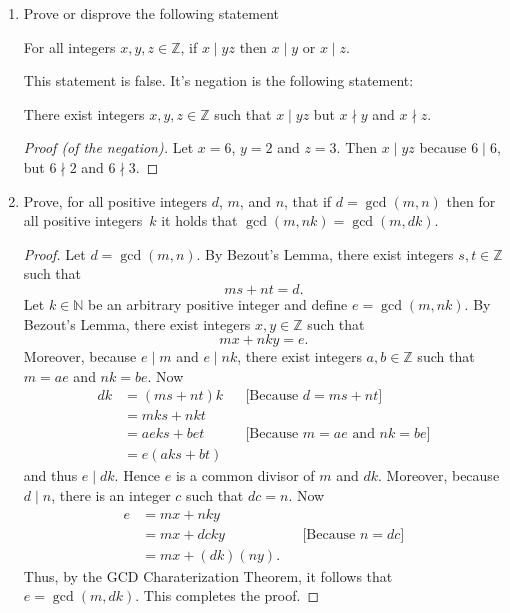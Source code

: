 \documentclass[11pt]{article}
\def\naturals{\mathbb{N}}
\def\integers{\mathbb{Z}}
\begin{document}
\begin{enumerate}
\begin{Solution}
\end{Solution}


\item Prove or disprove the following statement
\begin{center}
 For all integers $x,y,z\in\integers$, if $x\mid yz$ then $x\mid y $ or $x\mid z$. 
\end{center}

\begin{Solution}
 This statement is false. It's negation is the following statement:
 \begin{center}
  There exist integers $x,y,z\in\integers$ such that $x\mid yz$ but $x\nmid y$ and $x\nmid z$.
 \end{center}
\begin{proof}[Proof (of the negation)]
 Let $x=6$, $y=2$ and $z=3$. Then $x\mid yz$ because $6\mid 6$, but $6\nmid 2$ and $6\nmid 3$.
\end{proof}

\end{Solution}



\item Prove, for all positive integers $d$, $m$, and $n$, that if $d=\gcd(m,n)$ then for all positive integers~$k$ it holds that $\gcd(m,nk)=\gcd(m,dk)$.

\begin{Solution}
 \begin{proof}
Let $d=\gcd(m,n)$. By Bezout's Lemma, there exist integers $s,t\in\integers$ such that 
\[
 ms+nt = d.
\]
Let $k\in\naturals$ be an arbitrary positive integer and define $e=\gcd(m,nk)$. By Bezout's Lemma, there exist integers $x,y\in\integers$ such that 
\[
 mx + nky = e.
\]
Moreover, because $e\mid m$ and $e\mid nk$, there exist integers $a,b\in\integers$ such that $m=ae$ and $nk=be$. Now
\begin{align*}
 dk  & = (ms+nt)k &&\text{[Because }d=ms+nt]\\
     & = mks + nkt\\
     & =aeks + bet&&\text{[Because }m=ae\text{ and }nk=be]\\
     & =e(aks+bt)
\end{align*}
and thus $e\mid dk$. Hence $e$ is a common divisor of $m$ and $dk$. Moreover, because $d\mid n$, there is an integer $c$ such that $dc = n$. Now
\begin{align*}
 e &= mx + nky \\
   &= mx + dcky&&\text{[Because }n=dc]\\
   &=mx + (dk)(ny).
\end{align*}
Thus, by the GCD Charaterization Theorem, it follows that $e=\gcd(m,dk)$. This completes the proof.
 \end{proof}


\end{Solution}
\end{enumerate}
\end{document}
